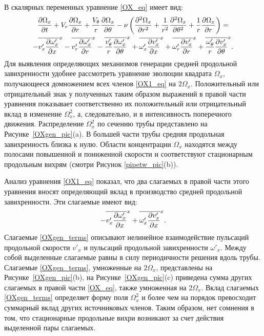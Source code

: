 В скалярных переменных уравнение \eqref{OX_eq} имеет вид:
\begin{multline}\label{OX1_eq}
\frac{\partial \Omega_x}{\partial t} + V_r \frac{\partial \Omega_x}{\partial r} + \frac{V_\theta}{r} \frac{\partial \Omega_x}{\partial \theta}
 - \nu\left(\frac{\partial ^2\Omega_x}{\partial r^2} + \frac{1}{r^2}\frac{\partial ^2\Omega_x}{\partial \theta^2} + \frac{1}{r}\frac{\partial \Omega_x}{\partial r}\right)= \\
 - \overline{v'_x \frac{\partial \omega'_x}{\partial x}}^x - \overline{v'_r \frac{\partial \omega'_x}{\partial r}}^x - \overline{\frac{v'_\theta}{r} \frac{\partial \omega'_x}{\partial \theta}}^x
 + \overline{\omega'_x \frac{\partial v'_x}{\partial x}}^x + \overline{\omega'_r \frac{\partial v'_x}{\partial r}}^x + \overline{\frac{\omega'_\theta}{r} \frac{\partial v'_x}{\partial \theta}}^x.
\end{multline}
Для выявления определяющих механизмов генерации средней продольной завихренности удобнее рассмотреть уравнение эволюции квадрата $\Omega_x$, получающееся домножением всех членов \eqref{OX1_eq} на $2\Omega_x$. Положительный или отрицательный знак у полученных таким образом выражений в правой части уравнения показывает соответственно их положительный или отрицательный вклад в изменение $\Omega_x^2$, а, следовательно, и в интенсивность поперечного движения. Распределение $\Omega_x^2$ по сечению трубы представлено на Рисунке~\ref{OXgen_pic}(a). В большей части трубы средняя продольная завихренность близка к нулю. Области концентрации $\Omega_x$ находятся между полосами повышенной и пониженной скорости и соответствуют стационарным продольным вихрям (смотри Рисунок \ref{pipetw_pic}(b)). 

Анализ уравнения \eqref{OX1_eq} показал, что два слагаемых в правой части этого уравнения вносят определяющий вклад в производство средней продольной завихренности. Эти слагаемые имеют вид:
\begin{equation}\label{OXgen_terms}
- \overline{v'_x \frac{\partial \omega'_x}{\partial x}}^x + \overline{ \omega'_x \frac{\partial v'_x}{\partial x} }^x.
\end{equation}
Слагаемые \eqref{OXgen_terms} описывают нелинейное взаимодействие пульсаций продольной скорости $v'_x$ и пульсаций продольной завихренности $\omega'_x$. Между собой выделенные слагаемые равны в силу периодичности решения вдоль трубы. Слагаемые \eqref{OXgen_terms}, умноженные на $2\Omega_x$, представлены на Рисунке~\ref{OXgen_pic}(b), на Рисунке~\ref{OXgen_pic}(c) приведена сумма других слагаемых в правой части \eqref{OX_eq}, также умноженная на $2\Omega_x$. Вклад слагаемых \eqref{OXgen_terms} определяет форму поля $\Omega_x^2$ и более чем на порядок превосходит суммарный вклад других источниковых членов. Таким образом, нет сомнения в том, что стационарные продольные вихри возникают за счет действия выделенной пары слагаемых.

